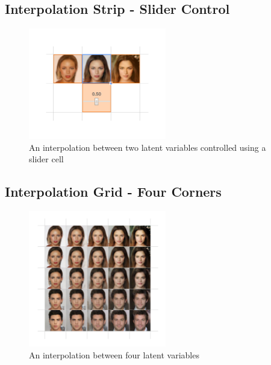 \documentclass[letterpaper]{article}
\begin{document}
\subsection{Interpolation Strip - Slider Control}
\begin{figure}[ht!]
  \centering
  \includegraphics[width=6cm]{figs/05-interpolation-by-slider.jpg}
  \caption{An interpolation between two latent variables controlled using a slider cell}
\end{figure}

\subsection{Interpolation Grid - Four Corners}
\begin{figure}[ht!]
  \centering
  \includegraphics[width=6cm]{figs/06-interpolation-grid.jpg}
  \caption{An interpolation between four latent variables}
\end{figure}

\newpage 
\end{document}
